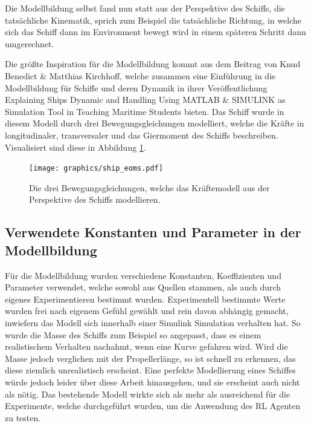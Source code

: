 \documentclass[]{iat}
\begin{document}
Die Modellbildung selbst fand nun statt aus der Perspektive des Schiffs, die tatsächliche Kinematik, sprich zum Beispiel die tatsächliche Richtung, in welche sich das Schiff dann im Environment bewegt wird in einem späteren Schritt dann umgerechnet.

Die größte Inspiration für die Modellbildung kommt aus dem Beitrag von Knud Benedict \& Matthias Kirchhoff, welche zusammen eine Einführung in die Modellbildung für Schiffe und deren Dynamik in ihrer Veröffentlichung \glqq Explaining Ships Dynamic and Handling Using MATLAB \& SIMULINK as Simulation Tool in Teaching Maritime Students\grqq{} \cite[]{Benedict2007ExplainingSD} bieten. Das Schiff wurde in diesem Modell durch drei Bewegungsgleichungen modelliert, welche die Kräfte in longitudinaler, transversaler und das Giermoment des Schiffs beschreiben. Visualisiert sind diese in Abbildung \ref{abb:ship_eoms}.
\begin{figure}[H]
    \texttt{[image: graphics/ship\_eoms.pdf]}
    \centering
    \caption{Die drei Bewegungsgleichungen, welche das Kräftemodell aus der Perspektive des Schiffs modellieren.}
    \label{abb:ship_eoms}
\end{figure}

\subsection{Verwendete Konstanten und Parameter in der Modellbildung}
Für die Modellbildung wurden verschiedene Konstanten, Koeffizienten und Parameter verwendet, welche sowohl aus Quellen stammen, als auch durch eigenes Experimentieren bestimmt wurden. Experimentell bestimmte Werte wurden frei nach eigenem Gefühl gewählt und rein davon abhängig gemacht, inwiefern das Modell sich innerhalb einer Simulink Simulation verhalten hat. So wurde die Masse des Schiffs zum Beispiel so angepasst, dass es einem \glqq realistischem\grqq{} Verhalten nachahmt, wenn eine Kurve gefahren wird. Wird die Masse jedoch verglichen mit der Propellerlänge, so ist schnell zu erkennen, das diese ziemlich unrealistisch erscheint. Eine perfekte Modellierung eines Schiffes würde jedoch leider über diese Arbeit hinausgehen, und sie erscheint auch nicht als nötig. Das bestehende Modell wirkte sich als mehr als ausreichend für die Experimente, welche durchgeführt wurden, um die Anwendung des RL Agenten zu testen.
\end{document}

